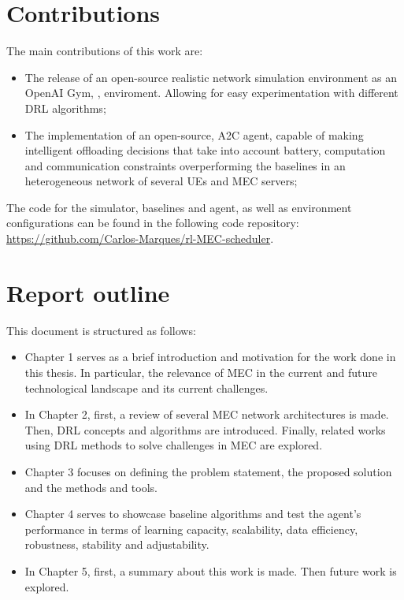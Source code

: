 \section{Contributions}
\noindent The main contributions of this work are:
\begin{itemize}
    \item The release of an open-source realistic network simulation environment as an OpenAI Gym, \cite{opengym}, enviroment. Allowing for easy experimentation with different \acrshort{DRL} algorithms;
    \item The implementation of an open-source, \acrshort{A2C} agent, capable of making intelligent offloading decisions that take into account battery, computation and communication constraints overperforming the baselines in an heterogeneous network of several \acrshort{UE}s and \acrshort{MEC} servers;
\end{itemize}

The code for the simulator, baselines and agent, as well as environment configurations can be found in the following code repository:
\href{https://github.com/Carlos-Marques/rl-MEC-scheduler}{https://github.com/Carlos-Marques/rl-MEC-scheduler}.

\section{Report outline}
\noindent This document is structured as follows:
\begin{itemize}
    \item Chapter 1 serves as a brief introduction and motivation for the work done in this thesis. In particular, the relevance of \acrshort{MEC} in the current and future technological landscape and its current challenges.
    \item In Chapter 2, first, a review of several \acrshort{MEC} network architectures is made. Then, \acrshort{DRL} concepts  and  algorithms  are  introduced. Finally, related works using \acrshort{DRL} methods to solve challenges in \acrshort{MEC} are explored.
    \item Chapter 3 focuses on defining the problem statement, the proposed solution and the methods and tools.
    \item Chapter 4 serves to showcase baseline algorithms and test the agent's performance in terms of learning capacity, scalability, data efficiency, robustness, stability and adjustability. 
    \item In Chapter 5, first, a summary about this work is made. Then future work is explored.
\end{itemize}







 





